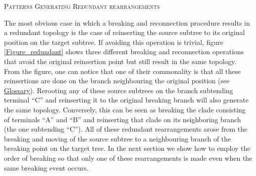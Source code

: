 \documentclass[12pt,letterpaper]{article}
\renewcommand{\section}[1]{%
\bigskip
\begin{center}
\begin{Large}
\normalfont\scshape #1
\medskip
\end{Large}
\end{center}}
\begin{document}

\section{Patterns Generating Redundant rearrangements}
The most obvious case in which a breaking and reconnection procedure results in a redundant topology is the case of reinserting the source subtree to its original position on the target subtree.
If avoiding this operation is trivial, figure \ref{Figure_redundant} shows three different breaking and reconnection operations that avoid the original reinsertion point but still result in the same topology. 
From the figure, one can notice that one of their commonality is that all these reinsertions are done on the branch neighbouring the original position (see \hyperref[Glossary]{Glossary}).
Rerooting any of these source subtrees on the branch subtending terminal ``C'' and reinserting it to the original breaking branch will also generate the same topology.
Conversely, this can be seen as breaking the clade consisting of terminals ``A'' and ``B'' and reinserting that clade on its neighboring branch (the one subtending ``C'').
All of these redundant rearrangements arose from the breaking and moving of the source subtree to a neighbouring branch of the breaking point on the target tree.
In the next section we show how to employ the order of breaking so that only one of these rearrangements is made even when the same breaking event occurs.
\end{document}
